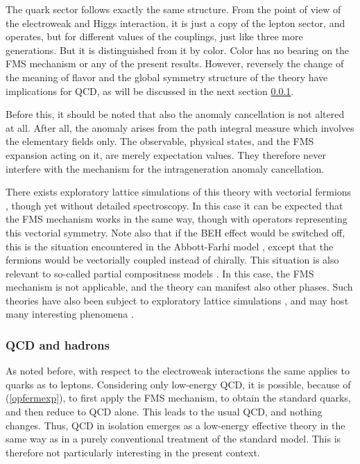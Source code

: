 \documentclass[final,twoside,12pt]{article}
\newcommand*{\pref}[1]{(\ref{#1})}
\newcommand*{\1}{1\!\!\!\bot}
\begin{document}
The quark sector follows exactly the same structure. From the point of view of the electroweak and Higgs interaction, it is just a copy of the lepton sector, and operates, but for different values of the couplings, just like three more generations. But it is distinguished from it by color. Color has no bearing on the FMS mechanism or any of the present results. However, reversely the change of the meaning of flavor and the global symmetry structure of the theory have implications for QCD, as will be discussed in the next section \ref{ss:qcd}.

Before this, it should be noted that also the anomaly cancellation is not altered at all. After all, the anomaly arises from the path integral measure \cite{Bohm:2001yx,Bertlmann:1996xk} which involves the elementary fields only. The observable, physical states, and the FMS expansion acting on it, are merely expectation values. They therefore never interfere with the mechanism for the intrageneration anomaly cancellation.

There exists exploratory lattice simulations of this theory with vectorial fermions \cite{Lee:1987zu,Aoki:1988aw}, though yet without detailed spectroscopy. In this case it can be expected that the FMS mechanism works in the same way, though with operators representing this vectorial symmetry. Note also that if the BEH effect would be switched off, this is the situation encountered in the Abbott-Farhi model \cite{Abbott:1981re}, except that the fermions would be vectorially coupled instead of chirally. This situation is also relevant to so-called partial compositness models \cite{Kaplan:1991dc,Sannino:2016sfx}. In this case, the FMS mechanism is not applicable, and the theory can manifest also other phases. Such theories have also been subject to exploratory lattice simulations \cite{Lee:1987zu,Aoki:1988aw,Aoki:1988fg,Hansen:2017mrt}, and may host many interesting phenomena \cite{Lee:1988ut,Hsu:1993zc}.

\subsubsection{QCD and hadrons}\label{ss:qcd}

As noted before, with respect to the electroweak interactions the same applies to quarks as to leptons. Considering only low-energy QCD, it is possible, because of \pref{opfermexp}, to first apply the FMS mechanism, to obtain the standard quarks, and then reduce to QCD alone. This leads to the usual QCD, and nothing changes. Thus, QCD in isolation emerges as a low-energy effective theory in the same way as in a purely conventional treatment of the standard model. This is therefore not particularly interesting in the present context.
\end{document}
